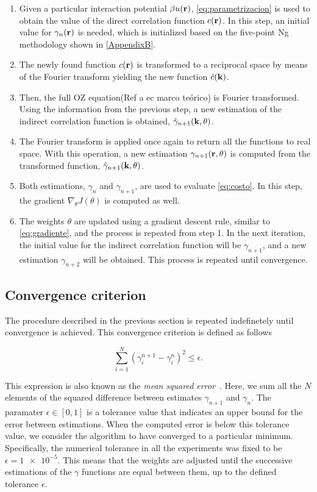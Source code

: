 \begin{enumerate}
    \item Given a particular interaction potential $\beta u(\mathbf{r})$, \autoref{eq:parametrizacion} is used to obtain the value of the direct correlation function $c(\mathbf{r})$. In this step, an initial value for $\gamma_{n}(\mathbf{r})$ is needed, which is initialized based on the five-point Ng methodology shown in \autoref{AppendixB}.
    \item The newly found function $c(\mathbf{r})$ is transformed to a reciprocal space by means of the Fourier transform yielding the new function $\hat{c}(\mathbf{k})$.
    \item Then, the full OZ equation(Ref a ec marco teórico) is Fourier transformed. Using the information from the previous step, a new estimation of the indirect correlation function is obtained, $\hat{\gamma}_{n+1}(\mathbf{k}, \theta)$.
    \item The Fourier transform is applied once again to return all the functions to real space. With this operation, a new estimation $\gamma_{n+1}(\mathbf{r}, \theta)$ is computed from the transformed function, $\hat{\gamma}_{n+1}(\mathbf{k}, \theta)$.
    \item Both estimations, $\gamma_{n}$ and $\gamma_{n+1}$, are used to evaluate \autoref{eq:costo}. In this step, the gradient $\nabla_{\theta} J(\theta)$ is computed as well.
    \item The weights $\theta$ are updated using a gradient descent rule, similar to \autoref{eq:gradiente}, and the process is repeated from step 1. In the next iteration, the initial value for the indirect correlation function will be $\gamma_{n+1}$, and a new estimation $\gamma_{n+2}$ will be obtained. This process is repeated until convergence.
\end{enumerate}

\subsection{Convergence criterion}
The procedure described in the previous section is repeated indefinetely until convergence
is achieved. This convergence criterion is defined as follows

\begin{equation}
    \sum_{i=1}^{N} {\left( \gamma^{n+1}_{i} - \gamma^{n}_{i} \right)}^2 \leq \epsilon .
    \label{eq:tolerancia}
\end{equation}

This expression is also known as the \emph{mean squared error}~\cite{goodfellowDeepLearning2016}.
Here, we sum all the $N$ elements of the squared difference between estimates $\gamma_{n+1}$
and $\gamma_{n}$. The paramater $\epsilon \in [0,1]$ is a tolerance value that indicates an 
upper bound for the error between estimations. When the computed error is below this 
tolerance value, we consider the algorithm to have converged to a particular minimum.
Specifically, the numerical tolerance in all the experiments was fixed to be
$\epsilon = \num{1e-5}$.
This means that the weights are adjusted until the successive estimations of the $\gamma$
functions are equal between them, up to the defined tolerance $\epsilon$.


